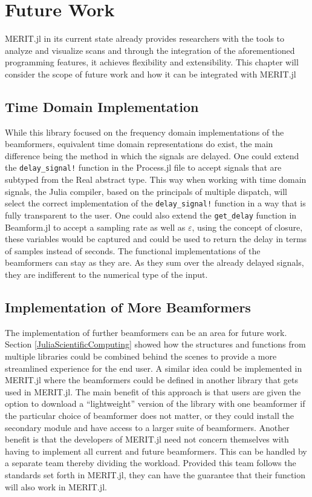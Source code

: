 \setcounter{chapter}{5}
\setcounter{section}{0}
\setcounter{subsection}{0}
\chapter*{Future Work}
MERIT.jl in its current state already provides researchers with the tools to analyze and visualize scans and through the
integration of the aforementioned programming features, it achieves flexibility and extensibility. This chapter will
consider the scope of future work and how it can be integrated with MERIT.jl

\section{Time Domain Implementation}
\label{TDImplementation}
While this library focused on the frequency domain implementations of the beamformers, equivalent time domain
representations do exist, the main difference being the method in which the signals are delayed. One could extend the
\lstinline[language=Julia]{delay_signal!} function in the Process.jl file to accept signals that are subtyped from the
Real abstract type. This way when working with time domain signals, the Julia compiler, based on the principals of
multiple dispatch, will select the correct implementation of the \lstinline[language=Julia]{delay_signal!} function in a
way that is fully transparent to the user. One could also extend the \lstinline[language=Julia]{get_delay} function in
Beamform.jl to accept a sampling rate as well as $\varepsilon$, using the concept of closure, these variables would be
captured and could be used to return the delay in terms of samples instead of seconds. The functional implementations of
the beamformers can stay as they are. As they sum over the already delayed signals, they are indifferent to the
numerical type of the input. 

\section{Implementation of More Beamformers}
The implementation of further beamformers can be an area for future work. Section \ref{JuliaScientificComputing} showed
how the structures and functions from multiple libraries could be combined behind the scenes to provide a more
streamlined experience for the end user. A similar idea could be implemented in MERIT.jl where the beamformers could be
defined in another library that gets used in MERIT.jl. The main benefit of this approach is that users are given the
option to download a ``lightweight'' version of the library with one beamformer if the particular choice of beamformer
does not matter, or they could install the secondary module and have access to a larger suite of beamformers. Another
benefit is that the developers of MERIT.jl need not concern themselves with having to implement all current and future
beamformers. This can be handled by a separate team thereby dividing the workload. Provided this team follows the
standards set forth in MERIT.jl, they can have the guarantee that their function will also work in MERIT.jl.

